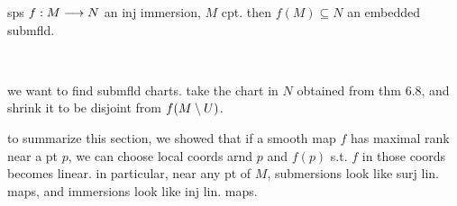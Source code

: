 \begin{thm}
	sps $f:M\longrightarrow N$ an inj immersion, $M$ cpt.
	then $f(M)\subseteq N$ an embedded submfld.
\end{thm} \

\begin{pf}[source=Primary Source Material]
	we want to find submfld charts.
	take the chart in $N$ obtained from thm 6.8, and shrink it to be disjoint
	from $f(M\setminus U)$.
\end{pf}

to summarize this section, we showed that if a smooth map $f$ has
maximal rank near a pt $p$, we can choose local coords arnd $p$ and $f(p)$
s.t. $f$ in those coords becomes linear.
in particular, near any pt of $M$, submersions look like surj lin. maps, and
immersions look like inj lin. maps.
